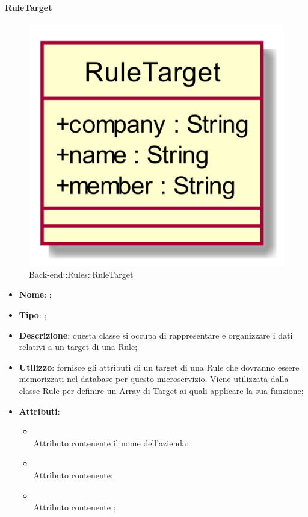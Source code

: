 \hypertarget{RuleTarget_label}{\paragraph{RuleTarget}}
\begin{figure}[h]
	\centering
	\includegraphics[width=\textwidth,height=\textheight,keepaspectratio]{images/ClassRuleTarget.png}
	\caption{Back-end::Rules::RuleTarget}
\end{figure}
\begin{itemize}
	\item \textbf{Nome}: ;
	\item \textbf{Tipo}: ;
	\item \textbf{Descrizione}: questa classe si occupa di rappresentare e organizzare i dati relativi a un target di una Rule;
	\item \textbf{Utilizzo}: fornisce gli attributi di un target di una Rule che dovranno essere memorizzati nel database per questo microservizio.
Viene utilizzata dalla classe Rule per definire un Array di Target ai quali applicare la sua funzione;
	\item \textbf{Attributi}:
	\begin{itemize}
		\item[]  \\
		Attributo contenente il nome dell'azienda;
		\item[]  \\
		Attributo contenente;
		\item[]  \\
		Attributo contenente ;
	\end{itemize}
\end{itemize}

